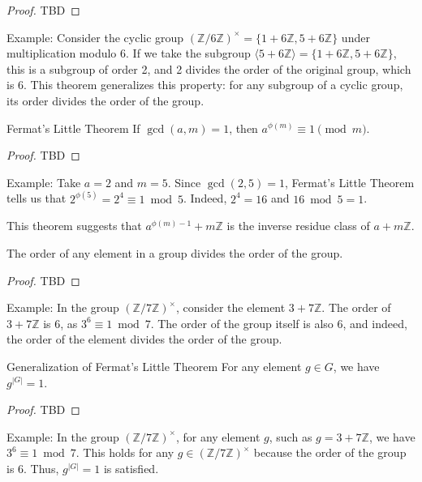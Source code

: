 \documentclass{article}
\begin{document}
\begin{proof}
    TBD
\end{proof}

Example: Consider the cyclic group $(\mathbb{Z}/6\mathbb{Z})^{\times} = \{1+6\mathbb{Z}, 5+6\mathbb{Z}\}$ under multiplication modulo 6. If we take the subgroup $\langle 5+6\mathbb{Z} \rangle = \{1+6\mathbb{Z}, 5+6\mathbb{Z}\}$, this is a subgroup of order 2, and 2 divides the order of the original group, which is 6. This theorem generalizes this property: for any subgroup of a cyclic group, its order divides the order of the group.

\begin{theorem}{Fermat's Little Theorem}{} If $\gcd(a, m) = 1$, then $a^{\phi(m)} \equiv 1 \pmod{m}$. \end{theorem}

\begin{proof}
    TBD
\end{proof}

Example: Take $a = 2$ and $m = 5$. Since $\gcd(2, 5) = 1$, Fermat's Little Theorem tells us that $2^{\phi(5)} = 2^4 \equiv 1 \bmod 5$. Indeed, $2^4 = 16$ and $16 \bmod 5 = 1$.

This theorem suggests that $a^{\phi(m) - 1} + m \mathbb{Z}$ is the inverse residue class of $a + m \mathbb{Z}$.

\begin{theorem}{}{} The order of any element in a group divides the order of the group. \end{theorem}

\begin{proof}
    TBD
\end{proof}

Example: In the group $(\mathbb{Z}/7\mathbb{Z})^{\times}$, consider the element $3 + 7\mathbb{Z}$. The order of $3 + 7\mathbb{Z}$ is 6, as $3^6 \equiv 1 \bmod 7$. The order of the group itself is also 6, and indeed, the order of the element divides the order of the group.

\begin{theorem}{Generalization of Fermat's Little Theorem}{} For any element $g \in G$, we have $g^{|G|} = 1$. \end{theorem}

\begin{proof}
    TBD
\end{proof}

Example: In the group $(\mathbb{Z}/7\mathbb{Z})^{\times}$, for any element $g$, such as $g = 3 + 7\mathbb{Z}$, we have $3^6 \equiv 1 \bmod 7$. This holds for any $g \in (\mathbb{Z}/7\mathbb{Z})^{\times}$ because the order of the group is 6. Thus, $g^{|G|} = 1$ is satisfied.
\end{document}
